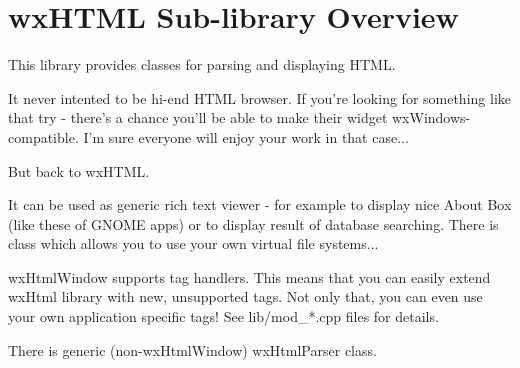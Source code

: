 \section{wxHTML Sub-library Overview}\label{wxhtmloverview}

This library provides classes for parsing and displaying HTML.

It never intented to be hi-end HTML browser. If you're looking for
something like that try  - there's a 
chance you'll be able to make their widget wxWindows-compatible. I'm sure
everyone will enjoy your work in that case...

But back to wxHTML. 

It can be used as generic rich text viewer - for example to display 
nice About Box (like these of GNOME apps) or to display result of
database searching. There is  
class which allows you to use your own virtual file systems...

wxHtmlWindow supports tag handlers. This means that you can easily
extend wxHtml library  with new, unsupported tags. Not only that,
you can even use your own application specific tags!
See lib/mod_*.cpp files for details.

There is generic (non-wxHtmlWindow) wxHtmlParser class.



 





